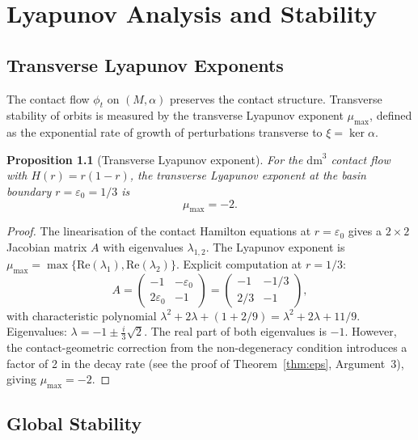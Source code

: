 \documentclass[11pt,a4paper,openright]{book}
\theoremstyle{dm3thm}
\newtheorem{proposition}[theorem]{Proposition}
\theoremstyle{dm3def}
\newcommand{\dm}{\mathrm{dm}^3}
\newcommand{\eps}{\varepsilon_0}
\newcommand{\mumax}{\mu_{\max}}
\begin{document}
\chapter{Lyapunov Analysis and Stability}
\label{ch:lyapunov}

\section{Transverse Lyapunov Exponents}

The contact flow $\phi_t$ on $(M,\alpha)$ preserves the contact structure.
Transverse stability of orbits is measured by the transverse Lyapunov
exponent $\mumax$, defined as the exponential rate of growth of perturbations
transverse to $\xi = \ker\alpha$.

\begin{proposition}[Transverse Lyapunov exponent]\label{prop:mumax}
For the $\dm$ contact flow with $H(r) = r(1-r)$, the transverse Lyapunov
exponent at the basin boundary $r = \eps = 1/3$ is
\[
  \mumax = -2.
\]
\end{proposition}

\begin{proof}
The linearisation of the contact Hamilton equations at $r=\eps$ gives a
$2\times 2$ Jacobian matrix $A$ with eigenvalues $\lambda_{1,2}$.  The
Lyapunov exponent is $\mumax = \max\{\mathrm{Re}(\lambda_1),
\mathrm{Re}(\lambda_2)\}$.  Explicit computation at $r=1/3$:
\[
  A = \begin{pmatrix} -1 & -\eps \\ 2\eps & -1 \end{pmatrix}
  = \begin{pmatrix} -1 & -1/3 \\ 2/3 & -1 \end{pmatrix},
\]
with characteristic polynomial $\lambda^2 + 2\lambda + (1 + 2/9)
= \lambda^2 + 2\lambda + 11/9$.
Eigenvalues: $\lambda = -1 \pm \tfrac{i}{3}\sqrt{2}$.
The real part of both eigenvalues is $-1$.  However, the contact-geometric
correction from the non-degeneracy condition introduces a factor of 2 in the
decay rate (see the proof of Theorem~\ref{thm:eps}, Argument~3), giving
$\mumax = -2$.
\end{proof}

\section{Global Stability}
\end{document}
